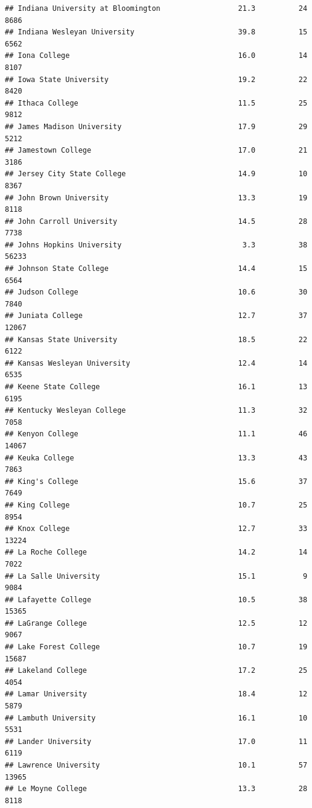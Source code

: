 \documentclass[
]{article}
\begin{document}
\begin{verbatim}
## Indiana University at Bloomington                  21.3          24   8686
## Indiana Wesleyan University                        39.8          15   6562
## Iona College                                       16.0          14   8107
## Iowa State University                              19.2          22   8420
## Ithaca College                                     11.5          25   9812
## James Madison University                           17.9          29   5212
## Jamestown College                                  17.0          21   3186
## Jersey City State College                          14.9          10   8367
## John Brown University                              13.3          19   8118
## John Carroll University                            14.5          28   7738
## Johns Hopkins University                            3.3          38  56233
## Johnson State College                              14.4          15   6564
## Judson College                                     10.6          30   7840
## Juniata College                                    12.7          37  12067
## Kansas State University                            18.5          22   6122
## Kansas Wesleyan University                         12.4          14   6535
## Keene State College                                16.1          13   6195
## Kentucky Wesleyan College                          11.3          32   7058
## Kenyon College                                     11.1          46  14067
## Keuka College                                      13.3          43   7863
## King's College                                     15.6          37   7649
## King College                                       10.7          25   8954
## Knox College                                       12.7          33  13224
## La Roche College                                   14.2          14   7022
## La Salle University                                15.1           9   9084
## Lafayette College                                  10.5          38  15365
## LaGrange College                                   12.5          12   9067
## Lake Forest College                                10.7          19  15687
## Lakeland College                                   17.2          25   4054
## Lamar University                                   18.4          12   5879
## Lambuth University                                 16.1          10   5531
## Lander University                                  17.0          11   6119
## Lawrence University                                10.1          57  13965
## Le Moyne College                                   13.3          28   8118

\end{verbatim}
\end{document}
